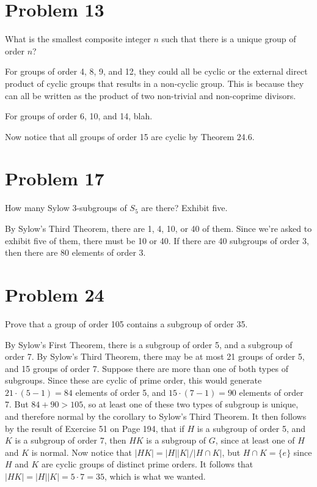 \documentclass{article}
\begin{document}
\section*{Problem 13}

What is the smallest composite integer $n$ such that there
is a unique group of order $n$?

For groups of order 4, 8, 9, and 12, they could all be
cyclic or the external direct product of cyclic groups that results
in a non-cyclic group.  This is because they can all be written as
the product of two non-trivial and non-coprime divisors.

For groups of order 6, 10, and 14, blah.

Now notice that all groups of order 15 are cyclic by Theorem 24.6.

\section*{Problem 17}

How many Sylow 3-subgroups of $S_5$ are there?  Exhibit five.

By Sylow's Third Theorem, there are 1, 4, 10, or 40 of them.  Since
we're asked to exhibit five of them, there must be 10 or 40.
If there are 40 subgroups of order 3, then there are 80 elements
of order 3.

\section*{Problem 24}

Prove that a group of order 105 contains a subgroup of order 35.

By Sylow's First Theorem, there is a subgroup of order 5, and a subgroup
of order 7.  By Sylow's Third Theorem, there
may be at most 21 groups of order 5, and 15 groups of order 7.  Suppose there
are more than one of both types of subgroups.  Since these are cyclic
of prime order, this would generate
$21\cdot(5-1)=84$ elements of order 5,
and $15\cdot(7-1)=90$ elements of order 7.  But $84+90>105$, so at least one
of these two types of subgroup is unique, and therefore normal by the corollary to
Sylow's Third Theorem.
It then follows by the result of Exercise 51 on
Page 194, that if $H$ is a subgroup of order 5, and $K$ is a subgroup of order 7,
then $HK$ is a subgroup of $G$, since at least one of $H$ and $K$ is normal.
Now notice that $|HK|=|H||K|/|H\cap K|$, but $H\cap K=\{e\}$ since $H$ and $K$
are cyclic groups of distinct prime orders.  It follows that $|HK|=|H||K|=5\cdot 7=35$,
which is what we wanted.
\end{document}
